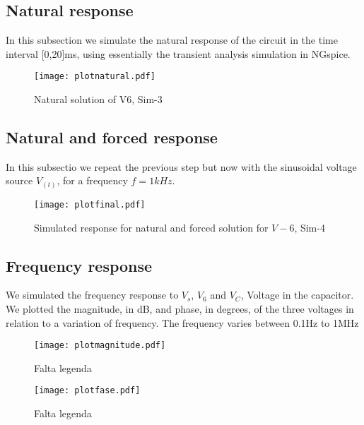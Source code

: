 \subsection{Natural response}
In this subsection we simulate the natural response of the circuit in the time interval [0,20]ms, using essentially the transient analysis simulation in NGspice. 

\FloatBarrier
\begin{figure}[h] \centering
\texttt{[image: plotnatural.pdf]}
\caption{Natural solution of V6, Sim-3}
\label{fig:plotnatural}
\end{figure}
\FloatBarrier

\subsection{Natural and forced response} 

In this subsectio we repeat the previous step but now with the sinusoidal voltage source $V_(t)$, for a frequency $f=1kHz$. 

\FloatBarrier
\begin{figure}[h] \centering
\texttt{[image: plotfinal.pdf]}
\caption{Simulated response for natural and forced solution for $V-6$, Sim-4}
\label{fig:plotfinal}
\end{figure}
\FloatBarrier 

\subsection{Frequency response} 

We simulated the frequency response to $V_s$, $V_6$ and $V_C$, Voltage in the capacitor. We plotted the magnitude, in dB, and phase, in degrees, of the three voltages in relation to a variation of frequency. The frequency varies between 0.1Hz to 1MHz 

\FloatBarrier
\begin{figure}[h] \centering
\texttt{[image: plotmagnitude.pdf]}
\caption{Falta legenda}
\label{fig:plotmagnitude}
\end{figure}
\FloatBarrier  

\FloatBarrier
\begin{figure}[h] \centering
\texttt{[image: plotfase.pdf]}
\caption{Falta legenda}
\label{fig:plotfase}
\end{figure}
\FloatBarrier 


%    


